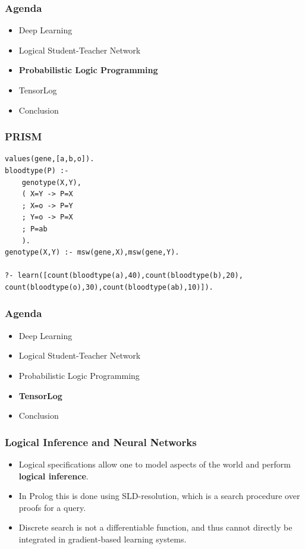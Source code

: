 \documentclass{beamer}
\begin{document}
\begin{frame}
\frametitle{Agenda}
\begin{itemize}
	\item Deep Learning
	\item Logical Student-Teacher Network
	\item \textbf{Probabilistic Logic Programming}
	\item TensorLog
	\item Conclusion
\end{itemize}
\end{frame}

\begin{frame}[fragile]
\frametitle{PRISM}
\begin{verbatim}
values(gene,[a,b,o]).
bloodtype(P) :-
    genotype(X,Y),
    ( X=Y -> P=X
    ; X=o -> P=Y
    ; Y=o -> P=X
    ; P=ab
    ).
genotype(X,Y) :- msw(gene,X),msw(gene,Y).

?- learn([count(bloodtype(a),40),count(bloodtype(b),20),
count(bloodtype(o),30),count(bloodtype(ab),10)]).
\end{verbatim}
\end{frame}

\begin{frame}
\frametitle{Agenda}
\begin{itemize}
	\item Deep Learning
	\item Logical Student-Teacher Network
	\item Probabilistic Logic Programming
	\item \textbf{TensorLog}
	\item Conclusion
\end{itemize}
\end{frame}

\begin{frame}
\frametitle{Logical Inference and Neural Networks}
\begin{itemize}
	\item Logical specifications allow one to model aspects of the world and perform \textbf{logical inference}.
	\item In Prolog this is done using SLD-resolution, which is a search procedure over proofs for a query.
	\item Discrete search is not a differentiable function, and thus cannot directly be integrated in gradient-based learning systems.
\end{itemize}
\end{frame}
\end{document}
